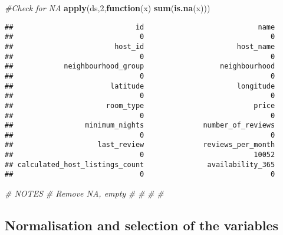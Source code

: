 \documentclass[
]{article}
\newenvironment{Shaded}{\begin{snugshade}}{\end{snugshade}}
\newcommand{\CommentTok}[1]{\textcolor[rgb]{0.56,0.35,0.01}{\textit{#1}}}
\newcommand{\ControlFlowTok}[1]{\textcolor[rgb]{0.13,0.29,0.53}{\textbf{#1}}}
\newcommand{\DecValTok}[1]{\textcolor[rgb]{0.00,0.00,0.81}{#1}}
\newcommand{\KeywordTok}[1]{\textcolor[rgb]{0.13,0.29,0.53}{\textbf{#1}}}
\newcommand{\NormalTok}[1]{#1}
\begin{document}
\begin{Shaded}
\begin{Highlighting}[]
\CommentTok{#Check for NA}
\KeywordTok{apply}\NormalTok{(ds,}\DecValTok{2}\NormalTok{,}\ControlFlowTok{function}\NormalTok{(x) }\KeywordTok{sum}\NormalTok{(}\KeywordTok{is.na}\NormalTok{(x)))}
\end{Highlighting}
\end{Shaded}

\begin{verbatim}
##                             id                           name 
##                              0                              0 
##                        host_id                      host_name 
##                              0                              0 
##            neighbourhood_group                  neighbourhood 
##                              0                              0 
##                       latitude                      longitude 
##                              0                              0 
##                      room_type                          price 
##                              0                              0 
##                 minimum_nights              number_of_reviews 
##                              0                              0 
##                    last_review              reviews_per_month 
##                              0                          10052 
## calculated_host_listings_count               availability_365 
##                              0                              0
\end{verbatim}

\begin{Shaded}
\begin{Highlighting}[]
\CommentTok{# NOTES}
\CommentTok{# Remove NA, empty}
\CommentTok{#}
\CommentTok{#}
\CommentTok{#}
\CommentTok{#}
\end{Highlighting}
\end{Shaded}

\hypertarget{normalisation-and-selection-of-the-variables}{%
\subsection{Normalisation and selection of the
variables}\label{normalisation-and-selection-of-the-variables}}
\end{document}
